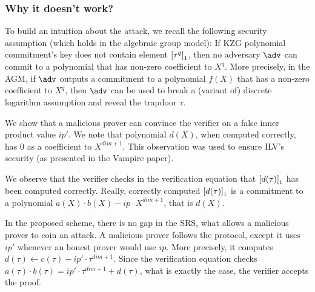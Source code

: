 \documentclass[runningheads,11pt,a4paper]{llncs}
\begin{document}
\subsubsection*{Why it doesn't work?}
To build an intuition about the attack, we recall the following security assumption (which holds in the algebraic group model): If KZG polynomial commitment's key does not contain element $\left[\tau^q\right]_{1}$, then no adversary $\adv$ can commit to a polynomial that has non-zero coefficient to $X^q$. More precisely, in the AGM, if $\adv$ outputs a commitment to a polynomial $f(X)$ that has a non-zero coefficient to $X^q$, then $\adv$ can be used to break a (variant of) discrete logarithm assumption and reveal the trapdoor $\tau$. 

We show that a malicious prover can convince the verifier on a false inner product value $ip'$. We note that polynomial $d(X)$, when computed correctly, has $0$ as a coefficient to $X^{dim + 1}$. This observation was used to ensure ILV's security (as presented in the Vampire paper). 

We observe that the verifier checks in the verification equation that $\left[d(\tau)\right]_{1}$ has been computed correctly. Really, correctly computed $\left[d (\tau)\right]_{1}$ is a commitment to a polynomial $a(X) \cdot b(X) - ip \cdot X^{dim + 1}$, that is $d(X)$.

In the proposed scheme, there is no gap in the SRS, what allows a malicious prover to coin an attack. A malicious prover follows the protocol, except it uses $ip'$ whenever an honest prover would use $ip$. More precisely, it computes $d(\tau) \gets c(\tau) - ip' \cdot \tau^{dim + 1}$. Since the verification equation checks $a(\tau) \cdot b (\tau) = ip' \cdot \tau^{dim + 1} + d(\tau)$, what is exactly the case, the verifier accepts the proof.
\end{document}
